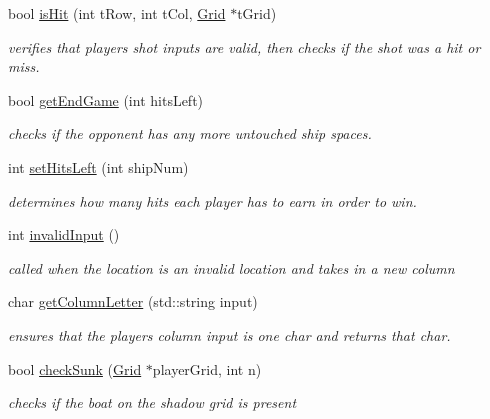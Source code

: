 \begin{DoxyCompactItemize}
\item 
bool \hyperlink{classGame_a44dd26e02329730028443a7ff28e1513}{is\+Hit} (int t\+Row, int t\+Col, \hyperlink{classGrid}{Grid} $\ast$t\+Grid)
\begin{DoxyCompactList}\small\item\em verifies that player\textquotesingle{}s shot inputs are valid, then checks if the shot was a hit or miss. \end{DoxyCompactList}\item 
bool \hyperlink{classGame_ad71f679248bf79e4edd5b93d5985b098}{get\+End\+Game} (int hits\+Left)
\begin{DoxyCompactList}\small\item\em checks if the opponent has any more untouched ship spaces. \end{DoxyCompactList}\item 
int \hyperlink{classGame_a6342beaca9d9388cb06025e2e577d41b}{set\+Hits\+Left} (int ship\+Num)
\begin{DoxyCompactList}\small\item\em determines how many hits each player has to earn in order to win. \end{DoxyCompactList}\item 
int \hyperlink{classGame_a964a5b6a1a7f69d7ad461b9ca7ff18fc}{invalid\+Input} ()
\begin{DoxyCompactList}\small\item\em called when the location is an invalid location and takes in a new column \end{DoxyCompactList}\item 
char \hyperlink{classGame_a53e176256e6d4962a37e0f22d6731fce}{get\+Column\+Letter} (std\+::string input)
\begin{DoxyCompactList}\small\item\em ensures that the player\textquotesingle{}s column input is one char and returns that char. \end{DoxyCompactList}\item 
bool \hyperlink{classGame_ac1e0a9a0ab9253e5b31e32e86e824458}{check\+Sunk} (\hyperlink{classGrid}{Grid} $\ast$player\+Grid, int n)
\begin{DoxyCompactList}\small\item\em checks if the boat on the shadow grid is present \end{DoxyCompactList}\end{DoxyCompactItemize}


